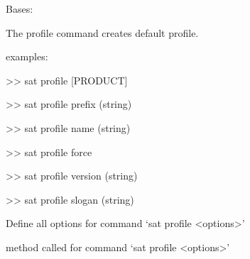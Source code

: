 \documentclass[a4paper,10pt,english]{sphinxmanual}
\begin{document}
\begin{fulllineitems}
\label{\detokenize{apidoc_commands/commands:commands.profile.Command}}
Bases: 

The profile command creates default profile.

\begin{DUlineblock}{0em}
\item[] examples: 
\item[] \textgreater{}\textgreater{} sat profile {[}PRODUCT{]} 
\item[] \textgreater{}\textgreater{} sat profile \textendash{}prefix (string)
\item[] \textgreater{}\textgreater{} sat profile \textendash{}name (string)
\item[] \textgreater{}\textgreater{} sat profile \textendash{}force
\item[] \textgreater{}\textgreater{} sat profile \textendash{}version (string) 
\item[] \textgreater{}\textgreater{} sat profile \textendash{}slogan (string) 
\end{DUlineblock}

\begin{fulllineitems}
\label{\detokenize{apidoc_commands/commands:commands.profile.Command.getParser}}
Define all options for command ‘sat profile \textless{}options\textgreater{}’

\end{fulllineitems}


\begin{fulllineitems}
\label{\detokenize{apidoc_commands/commands:commands.profile.Command.name}}
\end{fulllineitems}


\begin{fulllineitems}
\label{\detokenize{apidoc_commands/commands:commands.profile.Command.run}}
method called for command ‘sat profile \textless{}options\textgreater{}’

\end{fulllineitems}


\end{fulllineitems}
\end{document}
